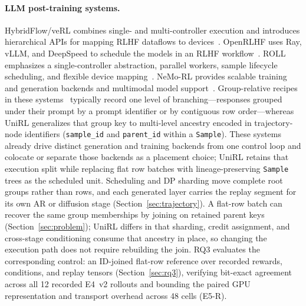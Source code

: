 \documentclass[10pt]{article}
\newcommand{\sample}{\texttt{Sample}}
\begin{document}
\paragraph{LLM post-training systems.}
HybridFlow/veRL combines single- and multi-controller execution and introduces hierarchical APIs for mapping RLHF dataflows to devices~\citep{sheng2024hybridflow}.
OpenRLHF uses Ray, vLLM, and DeepSpeed to schedule the models in an RLHF workflow~\citep{hu2024openrlhf}.
ROLL emphasizes a single-controller abstraction, parallel workers, sample lifecycle scheduling, and flexible device mapping~\citep{wang2025roll}.
NeMo-RL provides scalable training and generation backends and multimodal model support~\citep{nemorl2025}.
Group-relative recipes in these systems~\citep{sheng2024hybridflow,hu2024openrlhf,wang2025roll,nemorl2025} typically record one level of branching---responses grouped under their prompt by a prompt identifier or by contiguous row order---whereas UniRL generalizes that group key to multi-level ancestry encoded in trajectory-node identifiers (\texttt{sample\_id} and \texttt{parent\_id} within a \sample{}).
These systems already drive distinct generation and training backends from one control loop and colocate or separate those backends as a placement choice; UniRL retains that execution split while replacing flat row batches with lineage-preserving \sample{} trees as the scheduled unit.
Scheduling and DP sharding move complete root groups rather than rows, and each generated layer carries the replay segment for its own AR or diffusion stage (Section~\ref{sec:trajectory}).
A flat-row batch can recover the same group memberships by joining on retained parent keys (Section~\ref{sec:problem}); UniRL differs in that sharding, credit assignment, and cross-stage conditioning consume that ancestry in place, so changing the execution path does not require rebuilding the join.
RQ3 evaluates the corresponding control: an ID-joined flat-row reference over recorded rewards, conditions, and replay tensors (Section~\ref{sec:rq3}), verifying bit-exact agreement across all 12 recorded E4~v2 rollouts and bounding the paired GPU representation and transport overhead across 48 cells (E5-R).
\end{document}
